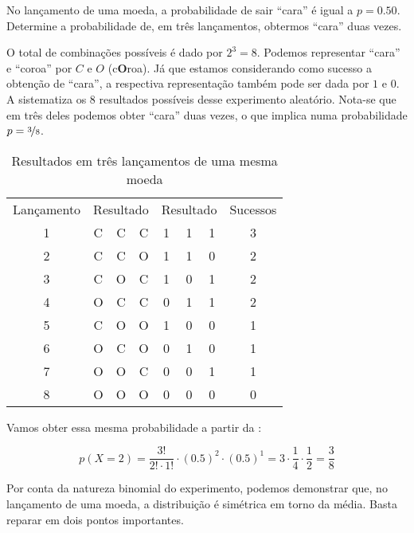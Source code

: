\begin{eg}
No lançamento de uma moeda, a probabilidade de sair ``cara'' é igual a
$p=0.50$. Determine a probabilidade de, em três lançamentos, obtermos
``cara'' duas vezes.
\end{eg}

\begin{sol}
O total de combinações possíveis é dado por $2^3=8$.  Podemos representar
``cara'' e ``coroa'' por $C$ e $O$ (c\textbf{O}roa). Já que estamos
considerando como sucesso a obtenção de ``cara'', a respectiva representação
também pode ser dada por $1$ e $0$. A 
sistematiza os 8 resultados possíveis desse experimento aleatório. Nota-se que
em três deles podemos obter ``cara'' duas vezes, o que implica numa
probabilidade $p=\nicefrac{3}{8}$.

\begin{table}[htpb]
    \centering
    \begin{tabular}{cccccccc}
        \toprule
        Lançamento & \multicolumn{3}{c}{Resultado} & \multicolumn{3}{c}{Resultado} & Sucessos \\
        \cmidrule(lr){2-4}
        \cmidrule(lr){5-7}
        1 & C & C & C & 1 & 1 & 1 & 3 \\
        2 & C & C & O & 1 & 1 & 0 & 2 \\
        3 & C & O & C & 1 & 0 & 1 & 2 \\
        4 & O & C & C & 0 & 1 & 1 & 2 \\
        5 & C & O & O & 1 & 0 & 0 & 1 \\
        6 & O & C & O & 0 & 1 & 0 & 1 \\
        7 & O & O & C & 0 & 0 & 1 & 1 \\
        8 & O & O & O & 0 & 0 & 0 & 0 \\
        \bottomrule
    \end{tabular}
    \caption{Resultados em três lançamentos de uma mesma moeda}
    \label{tab:lancamentos-moeda}
\end{table}

Vamos obter essa mesma probabilidade a partir da :

\[
p(X=2) = \frac{3!}{2! \cdot 1!} \cdot (0.5)^2 \cdot (0.5)^1 =
3 \cdot \frac{1}{4} \cdot \frac{1}{2} = \frac{3}{8}
\]
\end{sol}

Por conta da natureza binomial do experimento, podemos demonstrar que, no
lançamento de uma moeda, a distribuição é simétrica em torno da média. Basta
reparar em dois pontos importantes.

